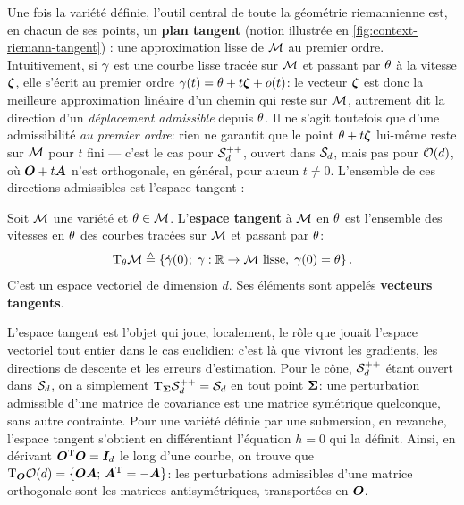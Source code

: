 Une fois la variété définie, l'outil central de toute la géométrie riemannienne est, en chacun de ses points, un \textbf{plan tangent} (notion illustrée en \cref{fig:context-riemann-tangent}) : une approximation lisse de $\mathcal{M}$ au premier ordre. Intuitivement, si $\gamma$ est une courbe lisse tracée sur $\mathcal{M}$ et passant par $\theta$ à la vitesse $\boldsymbol{\zeta}$, elle s'écrit au premier ordre $\gamma(t)=\theta+t\boldsymbol{\zeta}+o(t)$: le vecteur $\boldsymbol{\zeta}$ est donc la meilleure approximation linéaire d'un chemin qui reste sur $\mathcal{M}$, autrement dit la direction d'un \emph{déplacement admissible} depuis $\theta$. Il ne s'agit toutefois que d'une admissibilité \emph{au premier ordre}: rien ne garantit que le point $\theta+t\boldsymbol{\zeta}$ lui-même reste sur $\mathcal{M}$ pour $t$ fini --- c'est le cas pour $\mathcal{S}_{d}^{++}$, ouvert dans $\mathcal{S}_{d}$, mais pas pour $\mathcal{O}(d)$, où $\boldsymbol{O}+t\boldsymbol{A}$ n'est orthogonale, en général, pour aucun $t\neq0$. L'ensemble de ces directions admissibles est l'espace tangent :


\begin{definition}
\label{def:context-riemann-tangent}
  Soit $\mathcal{M}$ une variété et $\theta\in\mathcal{M}$. L'\textbf{espace tangent} à $\mathcal{M}$ en $\theta$ est l'ensemble des vitesses en $\theta$ des courbes tracées sur $\mathcal{M}$ et passant par $\theta$:
  \begin{equation}
    \mathrm{T}_{\theta}\mathcal{M}
    \triangleq
    \left\{
      \dot{\gamma}(0);\;
      \gamma:\mathbb{R}\to\mathcal{M} \text{ lisse},\;
      \gamma(0)=\theta
    \right\}.
    \label{eq:context-riemann-tangent}
  \end{equation}
  C'est un espace vectoriel de dimension $d$. Ses éléments sont appelés \textbf{vecteurs tangents}.
\end{definition}

  L'espace tangent est l'objet qui joue, localement, le rôle que jouait l'espace vectoriel tout entier dans le cas euclidien: c'est là que vivront les gradients, les directions de descente et les erreurs d'estimation. Pour le cône, $\mathcal{S}_{d}^{++}$ étant ouvert dans $\mathcal{S}_{d}$, on a simplement $\mathrm{T}_{\boldsymbol{\Sigma}}\mathcal{S}_{d}^{++}=\mathcal{S}_{d}$ en tout point $\boldsymbol{\Sigma}$: une perturbation admissible d'une matrice de covariance est une matrice symétrique quelconque, sans autre contrainte. Pour une variété définie par une submersion, en revanche, l'espace tangent s'obtient en différentiant l'équation $h=0$ qui la définit. Ainsi, en dérivant $\boldsymbol{O}^{\mathrm{T}}\boldsymbol{O}=\boldsymbol{I}_{d}$ le long d'une courbe, on trouve que $\mathrm{T}_{\boldsymbol{O}}\mathcal{O}(d)=\{\boldsymbol{O}\boldsymbol{A};\,\boldsymbol{A}^{\mathrm{T}}=-\boldsymbol{A}\}$: les perturbations admissibles d'une matrice orthogonale sont les matrices antisymétriques, transportées en $\boldsymbol{O}$.


